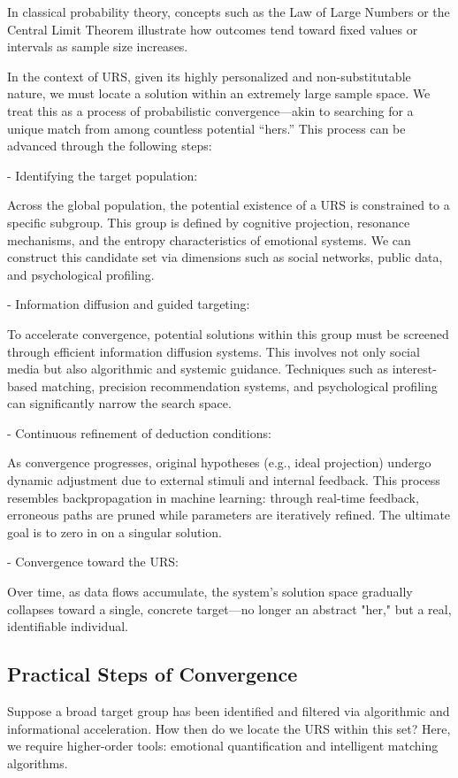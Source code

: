 \documentclass{article}
\begin{document}
In classical probability theory, concepts such as the Law of Large Numbers or the Central Limit Theorem illustrate how outcomes tend toward fixed values or intervals as sample size increases.

In the context of URS, given its highly personalized and non-substitutable nature, we must locate a solution within an extremely large sample space. We treat this as a process of probabilistic convergence—akin to searching for a unique match from among countless potential “hers.” This process can be advanced through the following steps:

- Identifying the target population: 

Across the global population, the potential existence of a URS is constrained to a specific subgroup. This group is defined by cognitive projection, resonance mechanisms, and the entropy characteristics of emotional systems. We can construct this candidate set via dimensions such as social networks, public data, and psychological profiling.

- Information diffusion and guided targeting: 

To accelerate convergence, potential solutions within this group must be screened through efficient information diffusion systems. This involves not only social media but also algorithmic and systemic guidance. Techniques such as interest-based matching, precision recommendation systems, and psychological profiling can significantly narrow the search space.

- Continuous refinement of deduction conditions: 

As convergence progresses, original hypotheses (e.g., ideal projection) undergo dynamic adjustment due to external stimuli and internal feedback. This process resembles backpropagation in machine learning: through real-time feedback, erroneous paths are pruned while parameters are iteratively refined. The ultimate goal is to zero in on a singular solution.

- Convergence toward the URS: 

Over time, as data flows accumulate, the system’s solution space gradually collapses toward a single, concrete target—no longer an abstract "her," but a real, identifiable individual.

\subsection{Practical Steps of Convergence}

Suppose a broad target group has been identified and filtered via algorithmic and informational acceleration. How then do we locate the URS within this set? Here, we require higher-order tools: emotional quantification and intelligent matching algorithms.
\end{document}
